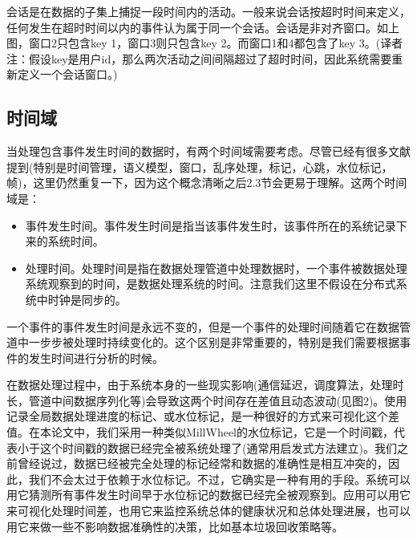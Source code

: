 \documentclass[oneside]{ctexbook}
\begin{document}
会话是在数据的子集上捕捉一段时间内的活动。一般来说会话按超时时间来定义，任何发生在超时时间以内的事件认为属于同一个会话。会话是非对齐窗口。如上图，窗口2只包含key 1，窗口3则只包含key 2。而窗口1和4都包含了key 3。(译者注：假设key是用户id，那么两次活动之间间隔超过了超时时间，因此系统需要重新定义一个会话窗口。)

\subsection{时间域}

当处理包含事件发生时间的数据时，有两个时间域需要考虑。尽管已经有很多文献提到(特别是时间管理，语义模型，窗口，乱序处理，标记，心跳，水位标记，帧)，这里仍然重复一下，因为这个概念清晰之后2.3节会更易于理解。这两个时间域是：

\begin{itemize}
\item 事件发生时间。事件发生时间是指当该事件发生时，该事件所在的系统记录下来的系统时间。
\item 处理时间。处理时间是指在数据处理管道中处理数据时，一个事件被数据处理系统观察到的时间，是数据处理系统的时间。注意我们这里不假设在分布式系统中时钟是同步的。
\end{itemize}
一个事件的事件发生时间是永远不变的，但是一个事件的处理时间随着它在数据管道中一步步被处理时持续变化的。这个区别是非常重要的，特别是我们需要根据事件的发生时间进行分析的时候。

在数据处理过程中，由于系统本身的一些现实影响(通信延迟，调度算法，处理时长，管道中间数据序列化等)会导致这两个时间存在差值且动态波动(见图2)。使用记录全局数据处理进度的标记、或水位标记，是一种很好的方式来可视化这个差值。在本论文中，我们采用一种类似MillWheel的水位标记，它是一个时间戳，代表小于这个时间戳的数据已经完全被系统处理了(通常用启发式方法建立)。我们之前曾经说过，数据已经被完全处理的标记经常和数据的准确性是相互冲突的，因此，我们不会太过于依赖于水位标记。不过，它确实是一种有用的手段。系统可以用它猜测所有事件发生时间早于水位标记的数据已经完全被观察到。应用可以用它来可视化处理时间差，也用它来监控系统总体的健康状况和总体处理进展，也可以用它来做一些不影响数据准确性的决策，比如基本垃圾回收策略等。
\end{document}
